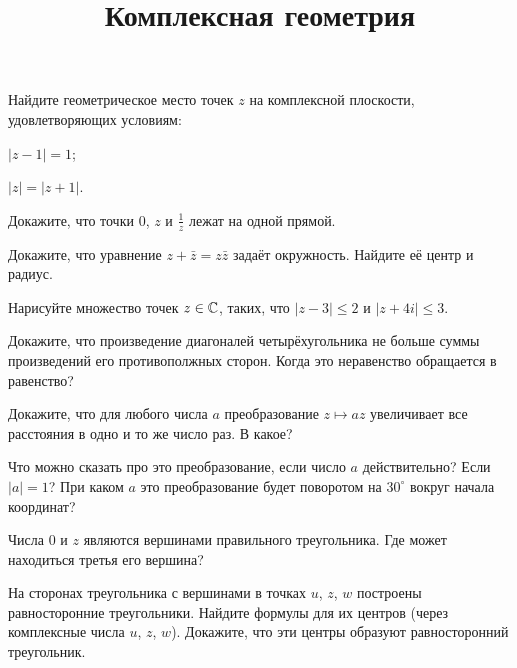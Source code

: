 \documentclass[a4paper, 12pt, num=23]{listok}
\begin{document}
\title{Комплексная геометрия}
\maketitle{}
\begin{problem}
	Найдите геометрическое место точек $z$ на комплексной плоскости, удовлетворяющих условиям:
	\begin{probparts}
		\item $|z - 1| = 1$;
		\item $|z| = |z + 1|$.
	\end{probparts}
\end{problem}
\begin{problem}
	Докажите, что точки $0$, $z$ и $\frac1z$ лежат на одной прямой.
\end{problem}
\begin{problem}
	Докажите, что уравнение $z + \bar z = z\bar z$ задаёт окружность. Найдите её центр и радиус.
\end{problem}
\begin{problem}
	Нарисуйте множество точек $z \in \mathbb{C}$, таких, что $|z - 3| \le 2$ и $|z + 4i| \le 3$.
\end{problem}
\begin{problem}
	Докажите, что произведение диагоналей четырёхугольника не больше суммы произведений его противополжных сторон. Когда это неравенство обращается в равенство?
\end{problem}
\begin{problem}
	Докажите, что для любого числа $a$ преобразование $z \mapsto az$ увеличивает все расстояния в одно и то же число раз. В какое?
\end{problem}
\begin{problem}
	Что можно сказать про это преобразование, если число $a$ действительно? Если $|a| = 1$?
	При каком $a$ это преобразование будет поворотом на $30^\circ$ вокруг начала координат?
\end{problem}
\begin{problem}
\begin{probparts}
	\item Числа $0$ и $z$ являются вершинами правильного треугольника.
	Где может находиться третья его вершина?
	\item На сторонах треугольника с вершинами в точках $u$, $z$, $w$ построены равносторонние треугольники.
	Найдите формулы для их центров (через комплексные числа $u$, $z$, $w$). Докажите, что эти центры образуют равносторонний треугольник.
\end{probparts}
\end{problem}
\end{document}
